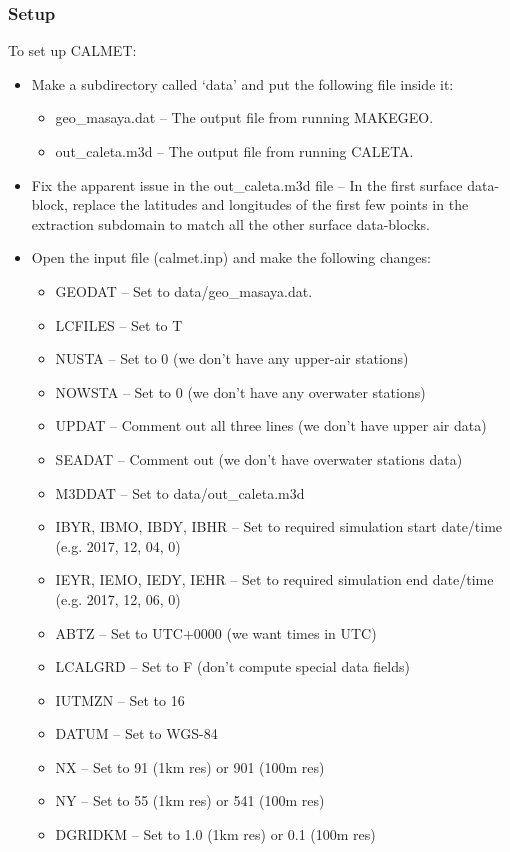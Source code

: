 \documentclass[10pt,a4paper]{article}
\begin{document}
\subsubsection{Setup}
To set up CALMET:
\begin{itemize}
\item Make a subdirectory called `data' and put the following file inside it:
\begin{itemize}
\item geo\_masaya.dat -- The output file from running MAKEGEO.
\item out\_caleta.m3d -- The output file from running CALETA.
\end{itemize}
\item Fix the apparent issue in the out\_caleta.m3d file -- In the first surface data-block, replace the latitudes and longitudes of the first few points in the extraction subdomain to match all the other surface data-blocks.
\item Open the input file (calmet.inp) and make the following changes:
\begin{itemize}
\item GEODAT -- Set to data/geo\_masaya.dat.
\item LCFILES -- Set to T
\item NUSTA -- Set to 0 (we don't have any upper-air stations)
\item NOWSTA -- Set to 0 (we don't have any overwater stations)
\item UPDAT -- Comment out all three lines (we don't have upper air data)
\item SEADAT -- Comment out (we don't have overwater stations data)
\item M3DDAT -- Set to data/out\_caleta.m3d
\item IBYR, IBMO, IBDY, IBHR -- Set to required simulation start date/time (e.g. 2017, 12, 04, 0)
\item IEYR, IEMO, IEDY, IEHR -- Set to required simulation end date/time (e.g. 2017, 12, 06, 0)
\item ABTZ -- Set to UTC+0000 (we want times in UTC)
\item LCALGRD -- Set to F (don't compute special data fields)
\item IUTMZN -- Set to 16
\item DATUM -- Set to WGS-84
\item NX -- Set to 91 (1km res) or 901 (100m res)
\item NY -- Set to 55 (1km res) or 541 (100m res)
\item DGRIDKM -- Set to 1.0 (1km res) or 0.1 (100m res)

\end{itemize}
\end{itemize}
\end{document}
